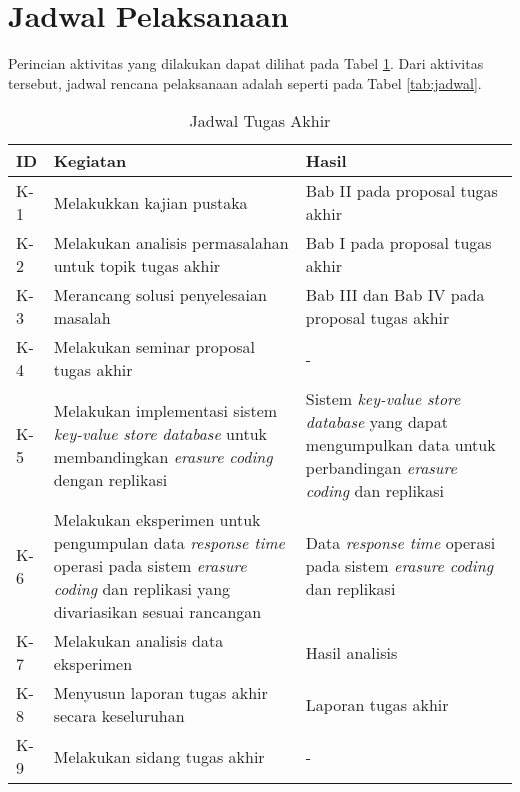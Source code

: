 \section{Jadwal Pelaksanaan}
\label{sec:jadwal-pelaksanaan}
Perincian aktivitas yang dilakukan dapat dilihat pada  Tabel \ref{tab:rincian-aktivitas}. Dari aktivitas tersebut, jadwal rencana pelaksanaan adalah seperti pada Tabel \ref{tab:jadwal}.

\begin{table}[h!]
\centering
\caption{Jadwal Tugas Akhir}
\begin{tabular}{|p{1cm}|p{6cm}|p{6cm}|}
\hline
ID & Kegiatan & Hasil \\ \hline
K-1  & Melakukkan kajian pustaka & Bab II pada proposal tugas akhir \\ \hline
K-2  & Melakukan analisis permasalahan untuk topik tugas akhir & Bab I pada proposal tugas akhir \\ \hline
K-3  & Merancang solusi penyelesaian masalah & Bab III dan Bab IV pada proposal tugas akhir \\ \hline
K-4  & Melakukan seminar proposal tugas akhir & - \\ \hline
K-5  & Melakukan implementasi sistem \textit{key-value store database} untuk membandingkan \textit{erasure coding} dengan replikasi \textit{} & Sistem \textit{key-value store database} yang dapat mengumpulkan data untuk perbandingan \textit{erasure coding} dan replikasi \\ \hline
K-6  & Melakukan eksperimen untuk pengumpulan data \textit{response time} operasi pada sistem \textit{erasure coding} dan replikasi yang divariasikan sesuai rancangan & Data \textit{response time} operasi pada sistem \textit{erasure coding} dan replikasi \\ \hline
K-7  & Melakukan analisis data eksperimen & Hasil analisis \\ \hline
K-8  & Menyusun laporan tugas akhir secara keseluruhan & Laporan tugas akhir \\ \hline
K-9  & Melakukan sidang tugas akhir & - \\ \hline
\end{tabular}
\label{tab:rincian-aktivitas}
\end{table}

